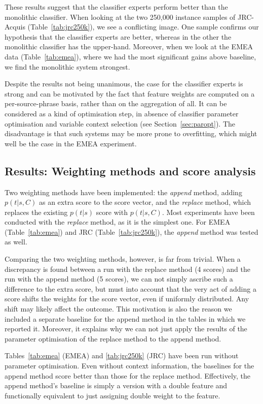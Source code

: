 \documentclass[smallextended]{svjour3}       %
\theoremstyle{break}
\begin{document}
These results suggest that the classifier experts perform better than the
monolithic classifier. When looking at the two 250,000 instance samples of
JRC-Acquis (Table~\ref{tab:jrc250k}), we see a conflicting image. One sample
confirms our hypothesis that the classifier experts are better, whereas in the
other the monolithic classifier has the upper-hand. Moreover, when we look at
the EMEA data (Table~\ref{tab:emea}), where we had the most significant gains
above baseline, we find the monolithic system strongest. 

Despite the results not being unanimous, the case for the classifier experts is
strong and can be motivated by the fact that feature weights are computed on a
per-source-phrase basis, rather than on the aggregation of all. It can be
considered as a kind of optimisation step, in absence of classifier parameter
optimisation and variable context selection (see Section~\ref{sec:paropt}). The
disadvantage is that such systems may be more prone to overfitting, which might
well be the case in the EMEA experiment.


\subsection{Results: Weighting methods and score analysis}
\label{sec:weighting}

Two weighting methods have been implemented: the \emph{append} method, adding
$p(t|s,C)$ as an extra score to the score vector, and the \emph{replace}
method, which replaces the existing $p(t|s)$ score with $p(t|s,C)$. Most
experiments have been conducted with the \emph{replace} method, as it is the
simplest one. For EMEA (Table~\ref{tab:emea}) and JRC
(Table~\ref{tab:jrc250k}), the \emph{append} method was tested as well.

Comparing the two weighting methods, however, is far from trivial. When a
discrepancy is found between a run with the replace method (4 scores) and the
run with the append method (5 scores), we can not simply ascribe such a
difference to the extra score, but must into account that the very act of
adding a score shifts the weights for the score vector, even if uniformly
distributed. Any shift may likely affect the outcome. This
motivation is also the reason we included a separate baseline for the append
method in the tables in which we reported it. Moreover, it explains why we can
not just apply the results of the parameter optimisation of the replace method
to the append method.

Tables~\ref{tab:emea} (EMEA) and \ref{tab:jrc250k} (JRC) have been run without
parameter optimisation. Even without context information, the baselines for the
append method score better than those for the replace method. Effectively, the
append method's baseline is simply a version with a double feature and
functionally equivalent to just assigning double weight to the feature.
\end{document}
